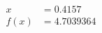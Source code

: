 \documentclass[preview]{standalone}
\begin{document}
\begin{align*}
x &= 0.4157\\f(x) &= 4.7039364
\end{align*}
\end{document}
